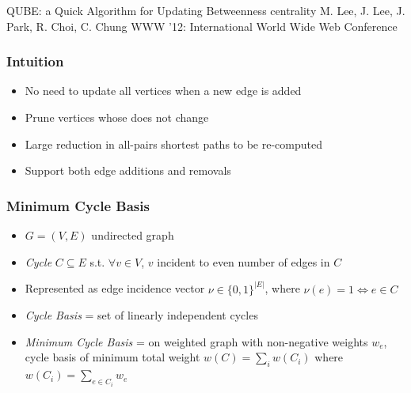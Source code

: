 \begin{frame}
  \centering
  \vfill
  {\huge QUBE: a Quick Algorithm for Updating Betweenness centrality}
  \vfill
  {\Large M. Lee, J. Lee, J. Park, R. Choi, C. Chung}
  \vfill
  {\large WWW '12: International World Wide Web Conference}
  \vfill
\end{frame}

\begin{frame}
  \frametitle{Intuition}

  \begin{itemize}
    \item No need to update all vertices when a new edge is added
    \item Prune vertices whose \betw does not change
    \item Large reduction in all-pairs shortest paths to be re-computed
    \item Support both edge additions and removals
  \end{itemize}
\end{frame}


\begin{frame}
  \frametitle{Minimum Cycle Basis}

  \begin{itemize}
    \item $G=(V,E)$ undirected graph
    \item \emph{Cycle} $C \subseteq E$ s.t. $\forall v \in V$, $v$ incident to even number of edges in $C$
    \item Represented as edge incidence vector $\nu \in \{ 0,1 \}^{|E|}$, where $\nu(e) = 1 \iff e \in C$
    \item \emph{Cycle Basis} = set of linearly independent cycles
    \item \emph{Minimum Cycle Basis} = on weighted graph with non-negative weights $w_e$, cycle basis of minimum total weight $w(C) = \sum_{i} w(C_i)$ where $w(C_i) = \sum_{e \in C_i} w_e$
  \end{itemize}
\end{frame}


